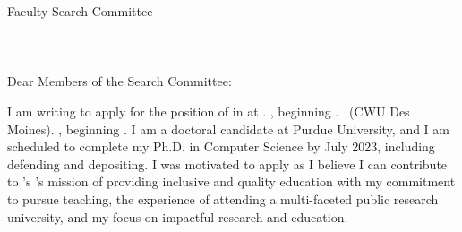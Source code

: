 \documentclass[10pt]{article}
\begin{document}
\thispagestyle{plain}

\pagestyle{empty}

Faculty Search Committee \\
\DepartmentName \\
\InstitutionName \\
\DepartmentAddress\\

Dear Members of the Search Committee:

I am writing to apply for the position of \PositionName{} 
\ifx\DepartmentName\undefined
\else
in 
\DepartmentName{} 
\fi
at \InstitutionName{}%
\ifx\shortInstitutionName\undefined
    \ifx\startDate\undefined
        .
    \else
        , beginning \startDate{}. %
    \fi
\else
    ~(CWU Des Moines).   \ifx\startDate\undefined
    \else
        , beginning \startDate{}. %
    \fi
\fi
I am a doctoral candidate at Purdue University, and I am scheduled to complete my Ph.D. in Computer Science by July 2023, including defending and depositing.
I was motivated to apply 
as I believe I can contribute to \ifx\shortInstitutionName\undefined \InstitutionName{}'s \else \shortInstitutionName{}'s \fi mission of providing 
inclusive and quality
education with my commitment to pursue teaching, the experience of 
attending a multi-faceted public research university, and my focus on 
impactful research and education. 
%
%
\end{document}
